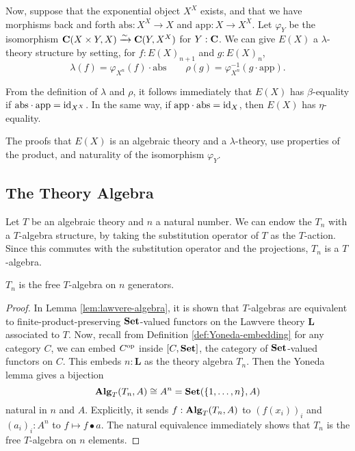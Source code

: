 \begin{definition}
  Now, suppose that the exponential object $ X^X $ exists, and that we have morphisms back and forth $ \mathrm{abs}: X^X \to X $ and $ \mathrm{app}: X \to X^X $. Let $ \varphi_Y $ be the isomorphism $ \mathbf{C}(X \times Y, X) \xrightarrow{\sim} \mathbf{C}(Y, X^X) $ for $ Y: \mathbf{C} $.
  We can give $ E(X) $ a $ \lambda $-theory structure by setting, for $ f: E(X)_{n + 1} $ and $ g: E(X)_n $,
  \[ \lambda(f) = \varphi_{X^n}(f) \cdot \mathrm{abs} \qquad \rho(g) = \varphi_{X^n}^{-1}(g \cdot \mathrm{app}). \]
\end{definition}

\begin{remark}
  From the definition of $ \lambda $ and $ \rho $, it follows immediately that $ E(X) $ has $ \beta $-equality if $ \mathrm{abs} \cdot \mathrm{app} = \text{id}_{X^X} $.
  In the same way, if $ \mathrm{app} \cdot \mathrm{abs} = \text{id}_{X} $, then $ E(X) $ has $ \eta $-equality.
\end{remark}

The proofs that $ E(X) $ is an algebraic theory and a $ \lambda $-theory, use properties of the product, and naturality of the isomorphism $ \varphi_Y $.

\subsection{The Theory Algebra}
\begin{example}\label{ex:theory-algebra}
  Let $ T $ be an algebraic theory and $ n $ a natural number. We can endow the $ T_n $ with a $ T $-algebra structure, by taking the substitution operator of $ T $ as the $ T $-action. Since this commutes with the substitution operator and the projections, $ T_n $ is a $ T $-algebra.
\end{example}

\begin{lemma}
  $ T_n $ is the free $ T $-algebra on $ n $ generators.
\end{lemma}
\begin{proof}
  In Lemma \ref{lem:lawvere-algebra}, it is shown that $ T $-algebras are equivalent to finite-product-preserving $ \mathbf{Set} $-valued functors on the Lawvere theory $ \mathbf L $ associated to $ T $. Now, recall from Definition \ref{def:Yoneda-embedding} for any category $ C $, we can embed $ C^{\text{op}} $ inside $ [C, \mathbf{Set}] $, the category of $ \mathbf{Set} $-valued functors on $ C $. This embeds $ n: \mathbf L $ as the theory algebra $ T_n $. Then the Yoneda lemma gives a bijection
  \[ \mathbf{Alg}_{T}(T_n, A) \cong A^n = \mathbf{Set}(\{ 1, \dots, n \}, A) \]
  natural in $ n $ and $ A $. Explicitly, it sends $ f: \mathbf{Alg}_{T}(T_n, A) $ to $ (f(x_i))_i $ and $ (a_i)_i : A^n $ to $ f \mapsto f \bullet a $. The natural equivalence immediately shows that $ T_n $ is the free $ T $-algebra on $ n $ elements.
\end{proof}

